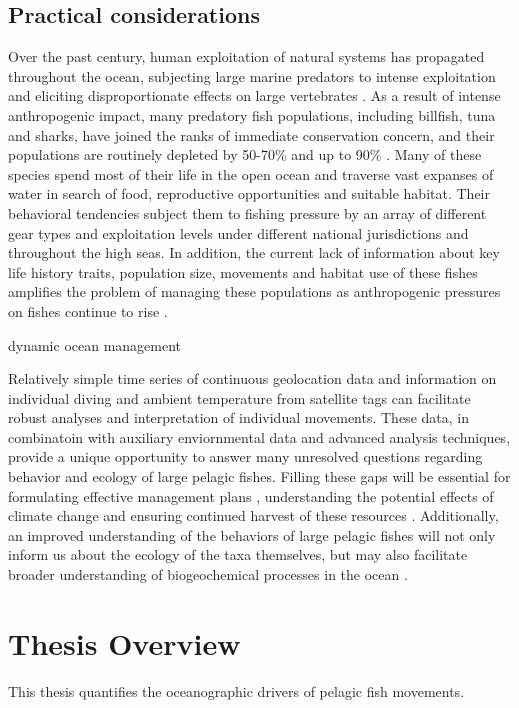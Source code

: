 \subsection{Practical considerations}
Over the past century, human exploitation of natural systems has propagated throughout the ocean, subjecting large marine predators to intense exploitation \citep{Byrne2017} and eliciting disproportionate effects on large vertebrates \citep{Jackson2001, Baum2003}. As a result of intense anthropogenic impact, many predatory fish populations, including billfish, tuna and sharks, have joined the ranks of immediate conservation concern, and their populations are routinely depleted by 50-70\% \citep{Hilborn2003} and up to 90\% \citep{Myers2005}. Many of these species spend most of their life in the open ocean and traverse vast expanses of water in search of food, reproductive opportunities and suitable habitat. Their behavioral tendencies subject them to fishing pressure by an array of different gear types and exploitation levels under different national jurisdictions and throughout the high seas. In addition, the current lack of information about key life history traits, population size, movements and habitat use of these fishes amplifies the problem of managing these populations as anthropogenic pressures on fishes continue to rise \citep{Dulvy2008, Ferretti2010}.

dynamic ocean management

Relatively simple time series of continuous geolocation data and information on individual diving and ambient temperature from satellite tags can facilitate robust analyses and interpretation of individual movements. These data, in combinatoin with auxiliary enviornmental data and advanced analysis techniques, provide a unique opportunity to answer many unresolved questions regarding behavior and ecology of large pelagic fishes. Filling these gaps will be essential for formulating effective management plans \citep{Cullis-Suzuki2010}, understanding the potential effects of climate change \citep{Hazen2012} and ensuring continued harvest of these resources \citep{pauly1998, Watson2013}. Additionally, an improved understanding of the behaviors of large pelagic fishes will not only inform us about the ecology of the taxa themselves, but may also facilitate broader understanding of biogeochemical processes in the ocean \citep{Lavery2010, Roman2010}.

\section{Thesis Overview}
This thesis quantifies the oceanographic drivers of pelagic fish movements. 


